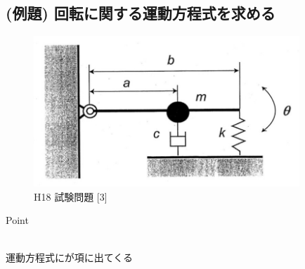 \documentclass[a4paper]{jsarticle}
\begin{document}
\subsection{(例題) 回転に関する運動方程式を求める}
\begin{figure}[htbp]
    \begin{center}
        \includegraphics[width=100mm]{images/kiriki_image2.jpg}
        \caption{H18 試験問題 [3]}
    \end{center}
\end{figure}
\begin{itembox}[l]{Point}
    \begin{center}
        \\
        運動方程式にが項に出てくる
    \end{center}
\end{itembox}
\end{document}
